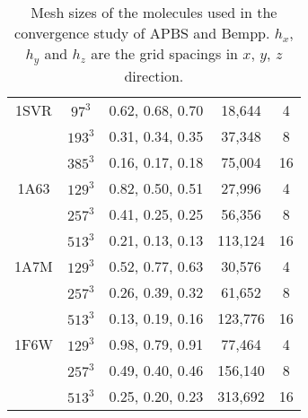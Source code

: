 \documentclass[12pt]{article}
\begin{document}
\begin{table}[]
\begin{tabular}{c|cc|cc}
  1SVR & $97^3$     & 0.62, 0.68, 0.70                 & 18,644     & 4                              \\
       & $193^3$    & 0.31, 0.34, 0.35                 & 37,348     & 8                              \\
       & $385^3$    & 0.16, 0.17, 0.18                 & 75,004     & 16                             \\ \hline
  1A63 & $129^3$    & 0.82, 0.50, 0.51                 & 27,996     & 4                              \\
       & $257^3$    & 0.41, 0.25, 0.25                 & 56,356     & 8                              \\
       & $513^3$    & 0.21, 0.13, 0.13                 & 113,124    & 16                             \\ \hline
  1A7M & $129^3$    & 0.52, 0.77, 0.63                 & 30,576     & 4                              \\
       & $257^3$    & 0.26, 0.39, 0.32                 & 61,652     & 8                              \\
       & $513^3$    & 0.13, 0.19, 0.16                 & 123,776    & 16                             \\ \hline
  1F6W & $129^3$    & 0.98, 0.79, 0.91                 & 77,464     & 4                              \\
       & $257^3$    & 0.49, 0.40, 0.46                 & 156,140    & 8                              \\
       & $513^3$    & 0.25, 0.20, 0.23                 & 313,692    & 16                            
  \end{tabular}
  \caption{Mesh sizes of the molecules used in the convergence study of APBS and Bempp.
  $h_x$, $h_y$ and $h_z$ are the grid spacings in $x$, $y$, $z$ direction.}
  \label{tab:APBS_mesh}
\end{table}
\end{document}
